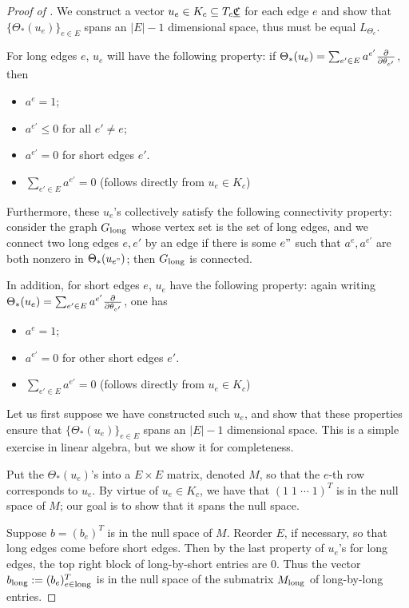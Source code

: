 \begin{proof}[Proof of ]
We construct a vector $u_e \in K_c \subseteq T_c {\underline{\mathfrak{C}}}$ for each edge $e$
and show that $\{\Theta_*(u_e)\}_{e\in E}$ spans an
$|E|-1$ dimensional space,
thus must be equal $L_{\Theta_c}$.


For long edges $e$, $u_e$ will have the following property:
if $\Theta_*(u_e) = \sum_{e' \in E} a^{e'} {\frac{\partial}{\partial \theta_{e'}}}$, then
\begin{itemize}
	\item $a^e = 1$;
	\item $a^{e'} \leq 0$ for all $e' \neq e$;
	\item $a^{e'} = 0$ for short edges $e'$.
	\item $\sum_{e' \in E} a^{e'} = 0$ (follows directly from $u_e \in K_c$)
\end{itemize}
Furthermore, these $u_e$'s collectively satisfy the following
connectivity property:
consider the graph $G_{\text{long}}$ whose vertex set is the set of long edges,
and we connect two long edges $e,e'$ by an edge if there is some $e"$ such that
$a^e, a^{e'}$ are both nonzero in $\Theta_*(u_{e"})$;
then $G_{\text{long}}$ is connected.

In addition, for short edges $e$,
$u_e$ have the following property: again writing
$\Theta_*(u_e) = \sum_{e' \in E} a^{e'} {\frac{\partial}{\partial \theta_{e'}}}$,
one has
\begin{itemize}
	\item $a^e = 1$;
	\item $a^{e'} = 0$ for other short edges $e'$.
	\item $\sum_{e' \in E} a^{e'} = 0$ (follows directly from $u_e \in K_c$)
\end{itemize}


Let us first suppose we have constructed such $u_e$,
and show that these properties ensure that
$\{\Theta_*(u_e)\}_{e\in E}$ spans an $|E|-1$ dimensional space.
This is a simple exercise in linear algebra,
but we show it for completeness.


Put the $\Theta_*(u_e)$'s into a $E \times E$ matrix,
denoted $M$,
so that the $e$-th row corresponds to $u_e$.
By virtue of $u_e \in K_c$, we have that $(1\; 1\; \cdots \; 1)^T$
is in the null space of $M$;
our goal is to show that it spans the null space.


Suppose $b = (b_e)^T$ is in the null space of $M$.
Reorder $E$, if necessary, so that long edges come before
short edges.
Then by the last property of $u_e$'s for long edges,
the top right block of long-by-short entries are 0.
Thus the vector $b_{\text{long}} := (b_e)_{e \in {\text{long}}}^T$ is in the null space
of the submatrix $M_{\text{long}}$ of long-by-long entries.



\end{proof}
